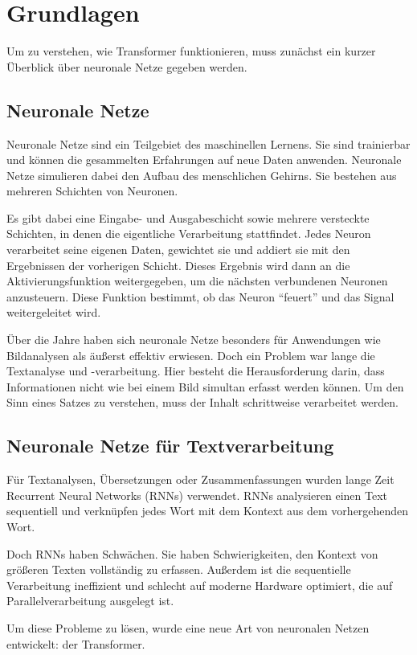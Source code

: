 \chapter{Grundlagen}

Um zu verstehen, wie Transformer funktionieren, muss zunächst ein kurzer Überblick über neuronale Netze gegeben werden.  

\section{Neuronale Netze}

Neuronale Netze sind ein Teilgebiet des maschinellen Lernens.  
Sie sind trainierbar und können die gesammelten Erfahrungen auf neue Daten anwenden.  
Neuronale Netze simulieren dabei den Aufbau des menschlichen Gehirns.  
Sie bestehen aus mehreren Schichten von Neuronen.  

Es gibt dabei eine Eingabe- und Ausgabeschicht sowie mehrere versteckte Schichten, in denen die eigentliche Verarbeitung stattfindet.  
Jedes Neuron verarbeitet seine eigenen Daten, gewichtet sie und addiert sie mit den Ergebnissen der vorherigen Schicht.  
Dieses Ergebnis wird dann an die Aktivierungsfunktion weitergegeben, um die nächsten verbundenen Neuronen anzusteuern.  
Diese Funktion bestimmt, ob das Neuron \enquote{feuert} und das Signal weitergeleitet wird.  

Über die Jahre haben sich neuronale Netze besonders für Anwendungen wie Bildanalysen als äußerst effektiv erwiesen.  
Doch ein Problem war lange die Textanalyse und -verarbeitung.  
Hier besteht die Herausforderung darin, dass Informationen nicht wie bei einem Bild simultan erfasst werden können.  
Um den Sinn eines Satzes zu verstehen, muss der Inhalt schrittweise verarbeitet werden.  

\section{Neuronale Netze für Textverarbeitung}

Für Textanalysen, Übersetzungen oder Zusammenfassungen wurden lange Zeit Recurrent Neural Networks (RNNs) verwendet.  
RNNs analysieren einen Text sequentiell und verknüpfen jedes Wort mit dem Kontext aus dem vorhergehenden Wort.  

Doch RNNs haben Schwächen.  
Sie haben Schwierigkeiten, den Kontext von größeren Texten vollständig zu erfassen.  
Außerdem ist die sequentielle Verarbeitung ineffizient und schlecht auf moderne Hardware optimiert, die auf Parallelverarbeitung ausgelegt ist.  

Um diese Probleme zu lösen, wurde eine neue Art von neuronalen Netzen entwickelt: der Transformer.  

